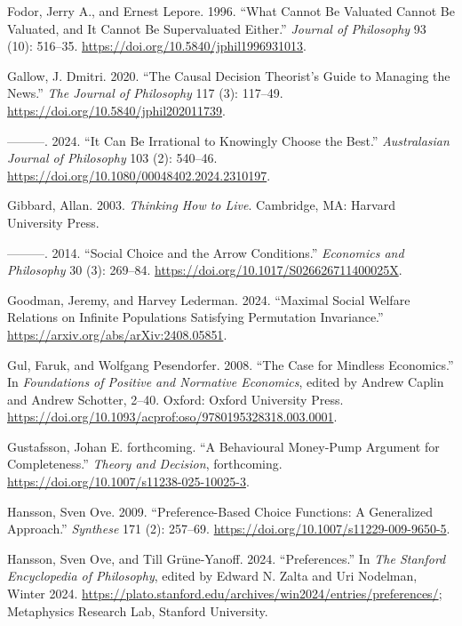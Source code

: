 \documentclass[
  10.5pt,
  twoside]{article}
\newlength{\cslhangindent}
\newenvironment{CSLReferences}[2] %
 {\begin{list}{}{%
  \setlength{\itemindent}{0pt}
  \setlength{\leftmargin}{0pt}
  \setlength{\parsep}{0pt}
  \ifodd #1
   \setlength{\leftmargin}{\cslhangindent}
   \setlength{\itemindent}{-1\cslhangindent}
  \fi
  \setlength{\itemsep}{#2\baselineskip}}}
 {\end{list}}
\begin{document}
\begin{CSLReferences}{1}{0}
Fodor, Jerry A., and Ernest Lepore. 1996. {``What Cannot Be Valuated
Cannot Be Valuated, and It Cannot Be Supervaluated Either.''}
\emph{Journal of Philosophy} 93 (10): 516--35.
\url{https://doi.org/10.5840/jphil1996931013}.

Gallow, J. Dmitri. 2020. {``The Causal Decision Theorist's Guide to
Managing the News.''} \emph{The Journal of Philosophy} 117 (3): 117--49.
\url{https://doi.org/10.5840/jphil202011739}.

---------. 2024. {``It Can Be Irrational to Knowingly Choose the
Best.''} \emph{Australasian Journal of Philosophy} 103 (2): 540--46.
\url{https://doi.org/10.1080/00048402.2024.2310197}.

Gibbard, Allan. 2003. \emph{Thinking How to Live}. Cambridge, MA:
Harvard University Press.

---------. 2014. {``Social Choice and the Arrow Conditions.''}
\emph{Economics and Philosophy} 30 (3): 269--84.
\url{https://doi.org/10.1017/S026626711400025X}.

Goodman, Jeremy, and Harvey Lederman. 2024. {``Maximal Social Welfare
Relations on Infinite Populations Satisfying Permutation Invariance.''}
\url{https://arxiv.org/abs/arXiv:2408.05851}.

Gul, Faruk, and Wolfgang Pesendorfer. 2008. {``The Case for Mindless
Economics.''} In \emph{Foundations of Positive and Normative Economics},
edited by Andrew Caplin and Andrew Schotter, 2--40. Oxford: Oxford
University Press.
\url{https://doi.org/10.1093/acprof:oso/9780195328318.003.0001}.

Gustafsson, Johan E. forthcoming. {``A Behavioural Money-Pump Argument
for Completeness.''} \emph{Theory and Decision}, forthcoming.
\url{https://doi.org/10.1007/s11238-025-10025-3}.

Hansson, Sven Ove. 2009. {``Preference-Based Choice Functions: A
Generalized Approach.''} \emph{Synthese} 171 (2): 257--69.
\url{https://doi.org/10.1007/s11229-009-9650-5}.

Hansson, Sven Ove, and Till Grüne-Yanoff. 2024. {``{Preferences}.''} In
\emph{The {Stanford} Encyclopedia of Philosophy}, edited by Edward N.
Zalta and Uri Nodelman, {W}inter 2024.
\url{https://plato.stanford.edu/archives/win2024/entries/preferences/};
Metaphysics Research Lab, Stanford University.


\end{CSLReferences}
\end{document}
